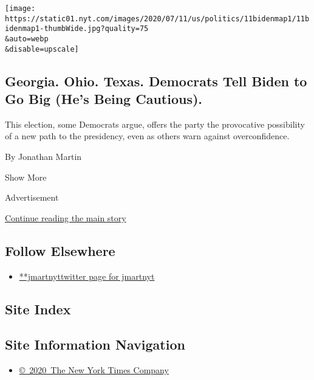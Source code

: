 \begin{enumerate}
  \texttt{[image: https://static01.nyt.com/images/2020/07/11/us/politics/11bidenmap1/11bidenmap1-thumbWide.jpg?quality=75\\\&auto=webp\\\&disable=upscale]}

  \hypertarget{georgia-ohio-texas-democrats-tell-biden-to-go-big-hes-being-cautious}{%
  \subsection{Georgia. Ohio. Texas. Democrats Tell Biden to Go Big (He's
  Being
  Cautious).}\label{georgia-ohio-texas-democrats-tell-biden-to-go-big-hes-being-cautious}}

  This election, some Democrats argue, offers the party the provocative
  possibility of a new path to the presidency, even as others warn
  against overconfidence.

  By Jonathan Martin
\end{enumerate}

Show More

Advertisement

\protect\hyperlink{after-mid2}{Continue reading the main story}

\hypertarget{follow-elsewhere}{%
\subsection{Follow Elsewhere}\label{follow-elsewhere}}

\begin{itemize}
\tightlist
\item
  \href{https://twitter.com/jmartnyt}{**jmartnyttwitter page for
  jmartnyt}
\end{itemize}

\hypertarget{site-index}{%
\subsection{Site Index}\label{site-index}}

\hypertarget{site-information-navigation}{%
\subsection{Site Information
Navigation}\label{site-information-navigation}}

\begin{itemize}
\tightlist
\item
  \href{https://help.nytimes.com/hc/en-us/articles/115014792127-Copyright-notice}{©~2020~The
  New York Times Company}
\end{itemize}

